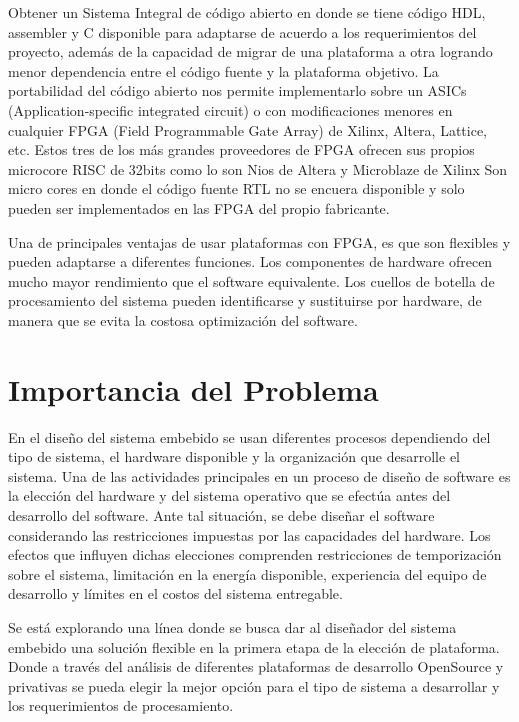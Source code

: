 Obtener un Sistema Integral de código abierto en donde se tiene código HDL, assembler y C disponible para adaptarse de acuerdo a los requerimientos
del proyecto, además de la capacidad de migrar de una plataforma a otra logrando menor dependencia entre el código fuente y la plataforma
objetivo. La portabilidad del código abierto nos permite implementarlo sobre un ASICs (Application-specific integrated circuit) o con modificaciones
menores en cualquier FPGA (Field Programmable Gate Array) de Xilinx, Altera, Lattice, etc. Estos tres de los más grandes proveedores de FPGA  %
ofrecen sus propios microcore RISC de 32bits como lo son Nios de  Altera y Microblaze de Xilinx  Son micro cores en donde el código fuente RTL no se
encuera disponible y solo pueden ser implementados en las FPGA del propio fabricante.

Una de principales ventajas de usar plataformas con FPGA, es que son flexibles y pueden adaptarse a diferentes funciones. Los componentes de
hardware ofrecen mucho mayor rendimiento que el software equivalente. Los cuellos de botella de procesamiento del sistema pueden identificarse y
sustituirse por hardware, de manera que se evita la costosa optimización del software.

\section{Importancia del Problema}

En el diseño del sistema embebido se usan diferentes procesos dependiendo del tipo de sistema, el hardware disponible y la organización que
desarrolle el sistema. Una de las actividades principales en un proceso de diseño de software es la elección del hardware y del sistema operativo que
se efectúa antes del desarrollo del software. Ante tal situación, se debe diseñar el software considerando las restricciones impuestas por las
capacidades del hardware.
Los efectos que influyen dichas elecciones comprenden restricciones de temporización sobre el sistema, limitación en la energía disponible,
experiencia del equipo de desarrollo y límites en el costos del sistema entregable.
 
Se está explorando una línea donde se busca dar al diseñador del sistema embebido una solución flexible en la primera etapa de la elección de
plataforma. Donde a través del análisis de diferentes plataformas de desarrollo OpenSource y privativas se pueda elegir la mejor opción para el tipo
de sistema a desarrollar y los requerimientos de procesamiento.
 

